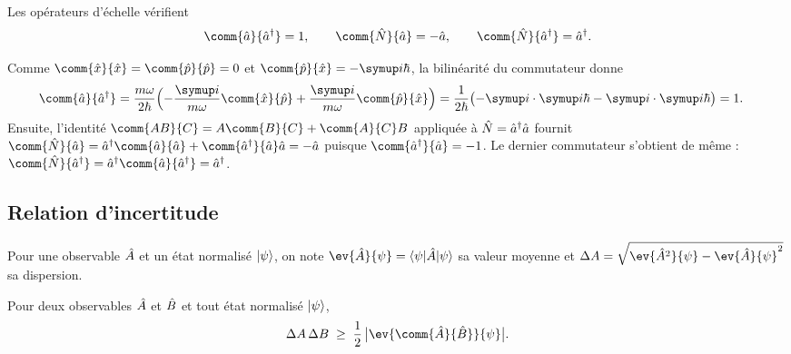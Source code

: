 \begin{lemme}\label{lem:comm}
  Les opérateurs d'échelle vérifient
  \begin{equation}
    \comm{\op{a}}{\op{a}\adj} = 1,
    \qquad
    \comm{\op{N}}{\op{a}} = -\op{a},
    \qquad
    \comm{\op{N}}{\op{a}\adj} = \op{a}\adj .
    \label{eq:comm}
  \end{equation}
\end{lemme}

\begin{demonstration}
  Comme $\comm{\op{x}}{\op{x}}=\comm{\op{p}}{\op{p}}=0$ et
  $\comm{\op{p}}{\op{x}}=-\ii\hbar$, la bilinéarité du commutateur donne
  \begin{align*}
    \comm{\op{a}}{\op{a}\adj}
      &= \frac{m\omega}{2\hbar}\Bigl(
         -\frac{\ii}{m\omega}\comm{\op{x}}{\op{p}}
         +\frac{\ii}{m\omega}\comm{\op{p}}{\op{x}}\Bigr)
       = \frac{1}{2\hbar}\bigl(-\ii\cdot\ii\hbar-\ii\cdot\ii\hbar\bigr)
       = 1 .
  \end{align*}
  Ensuite, l'identité $\comm{AB}{C}=A\comm{B}{C}+\comm{A}{C}B$ appliquée à
  $\hat{N}=\hat{a}^{\dagger}\hat{a}$ fournit
  $\comm{\op{N}}{\op{a}}=\op{a}\adj\comm{\op{a}}{\op{a}}+\comm{\op{a}\adj}{\op{a}}\op{a}=-\op{a}$
  puisque $\comm{\op{a}\adj}{\op{a}}=-1$. Le dernier commutateur s'obtient de
  même : $\comm{\op{N}}{\op{a}\adj}=\op{a}\adj\comm{\op{a}}{\op{a}\adj}=\op{a}\adj$.
\end{demonstration}

\subsection{Relation d'incertitude}

Pour une observable $\hat{A}$ et un état normalisé $\lvert\psi\rangle$, on note
$\ev{\op{A}}{\psi}=\bra{\psi}\op{A}\ket{\psi}$ sa valeur moyenne et
$\Delta A=\sqrt{\ev{\op{A}^{2}}{\psi}-\ev{\op{A}}{\psi}^{2}}$ sa dispersion.

\begin{theoreme}\label{thm:robertson}
  Pour deux observables $\hat{A}$ et $\hat{B}$ et tout état normalisé
  $\lvert\psi\rangle$,
  \begin{equation}
    \Delta A\,\Delta B \;\geq\; \frac{1}{2}\,\abs[\big]{\ev{\comm{\op{A}}{\op{B}}}{\psi}} .
    \label{eq:robertson}
  \end{equation}
\end{theoreme}

